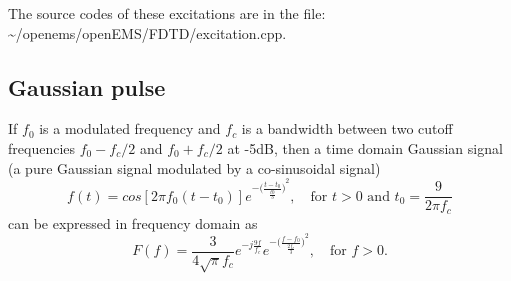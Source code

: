 The source codes of these excitations are in the file: \textasciitilde/openems/openEMS/FDTD/excitation.cpp.
    \subsection{Gaussian pulse} \label{subsec:Gaussian pulse}
If $f_0$ is a modulated frequency and $f_c$ is a bandwidth between  two cutoff frequencies $f_0-f_c/2$ and  $f_0+f_c/2$ at -5dB, then a time domain Gaussian signal (a pure Gaussian signal modulated by a co-sinusoidal signal)
\begin{equation}\label{equ:GussianSignal_time}
 f(t)=cos[2\pi f_0(t-t_0)]e^{-{\big(\frac{t-t_0}{\frac{t0}{3}}\big)}^2}, \quad \text{for } t>0 \text{ and }t_0=\frac{9}{2\pi f_c}
\end{equation}
can be expressed  in frequency domain as
\begin{equation}\label{equ:GussianSignal_freq}
F(f)=\frac{3}{4\sqrt{\pi}f_c}e^{-j\frac{9f}{f_c}}e^{-{\big(\frac{f-f_0}{\frac{2f_c}{3}}\big)}^2},\quad \text{for } f>0 .
\end{equation}

